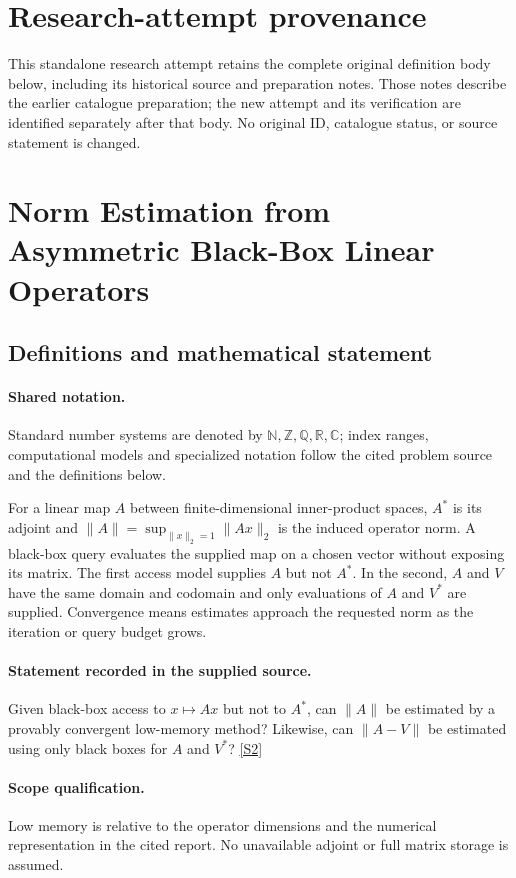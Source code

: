 \documentclass[11pt]{article}
\begin{document}
\section*{Research-attempt provenance}
This standalone research attempt retains the complete original definition body below,
including its historical source and preparation notes. Those notes describe the
earlier catalogue preparation; the new attempt and its verification are identified
separately after that body. No original ID, catalogue status, or source statement is changed.

\section{Norm Estimation from Asymmetric Black-Box Linear Operators}\label{statement}

\subsection{Definitions and mathematical statement}

\paragraph{Shared notation.}Standard number systems are denoted by $\mathbb N,\mathbb Z,\mathbb Q,\mathbb R,\mathbb C$; index ranges, computational models and specialized notation follow the cited problem source and the definitions below.


For a linear map $A$ between finite-dimensional inner-product spaces, $A^*$ is its adjoint and $\lVert A\rVert=\sup_{\lVert x\rVert_2=1}\lVert Ax\rVert_2$ is the induced operator norm. A black-box query evaluates the supplied map on a chosen vector without exposing its matrix. The first access model supplies $A$ but not $A^*$. In the second, $A$ and $V$ have the same domain and codomain and only evaluations of $A$ and $V^*$ are supplied. Convergence means estimates approach the requested norm as the iteration or query budget grows.
\paragraph{Statement recorded in the supplied source.}
Given black-box access to $x\mapsto Ax$ but not to $A^*$, can $\lVert A\rVert$ be estimated by a provably convergent low-memory method? Likewise, can $\lVert A-V\rVert$ be estimated using only black boxes for $A$ and $V^*$? \href{https://doi.org/10.4171/owr/2022/38}{[S2]}
\paragraph{Scope qualification.}
Low memory is relative to the operator dimensions and the numerical representation in the cited report. No unavailable adjoint or full matrix storage is assumed.
\end{document}
